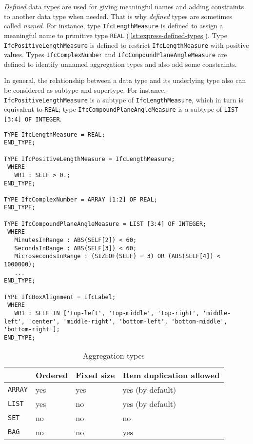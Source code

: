 \emph{Defined} data types are used for giving meaningful names and adding constraints to another data type when needed.
That is why \emph{defined} types are sometimes called \emph{named}.
For instance, type \texttt{Ifc\-Length\-Measure} is defined to assign a meaningful name to primitive type \texttt{REAL} (\autoref{lst:express-defined-types}).
Type \texttt{Ifc\-Positive\-Length\-Measure} is defined to restrict \texttt{Ifc\-Length\-Measure} with positive values.
Types \texttt{Ifc\-Complex\-Number} and \texttt{Ifc\-Compound\-Plane\-Angle\-Measure} are defined to identify unnamed aggregation types and also add some constraints.

In general, the relationship between a data type and its underlying type also can be considered as subtype and supertype.
For instance, \texttt{IfcPositiveLengthMeasure} is a subtype of \texttt{IfcLengthMeasure}, which in turn is equivalent to \texttt{REAL}; type \texttt{IfcCompoundPlaneAngleMeasure} is a subtype of \texttt{LIST [3:4] OF INTEGER}.



\begin{lstlisting}[caption={Printout of several defined data types},label=lst:express-defined-types]
TYPE IfcLengthMeasure = REAL;
END_TYPE;

TYPE IfcPositiveLengthMeasure = IfcLengthMeasure;
 WHERE
   WR1 : SELF > 0.;
END_TYPE;

TYPE IfcComplexNumber = ARRAY [1:2] OF REAL;
END_TYPE;

TYPE IfcCompoundPlaneAngleMeasure = LIST [3:4] OF INTEGER;
 WHERE
   MinutesInRange : ABS(SELF[2]) < 60;
   SecondsInRange : ABS(SELF[3]) < 60;
   MicrosecondsInRange : (SIZEOF(SELF) = 3) OR (ABS(SELF[4]) < 1000000);
   ...
END_TYPE;

TYPE IfcBoxAlignment = IfcLabel;
 WHERE
   WR1 : SELF IN ['top-left', 'top-middle', 'top-right', 'middle-left', 'center', 'middle-right', 'bottom-left', 'bottom-middle', 'bottom-right'];
END_TYPE;
\end{lstlisting}


\begin{table}\footnotesize
    \centering
    \caption{Aggregation types}
    \label{tab:express-aggregation-types}
    
    
    \begin{tabulary}{\columnwidth}{XXXX}
        \hline
                            &   Ordered & Fixed size    & Item duplication allowed  \\
        \hline
            \texttt{ARRAY}  &   yes     & yes           & yes (by default)          \\
            \texttt{LIST}   &   yes     & no            & yes (by default)          \\
            \texttt{SET}    &   no      & no            & no                        \\
            \texttt{BAG}    &   no      & no            & yes                       \\
        \hline
    \end{tabulary}
\end{table}




